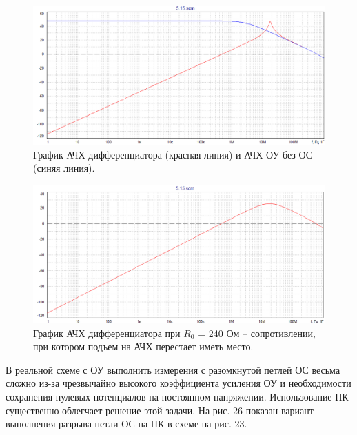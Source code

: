 \documentclass[a4paper,14pt]{extarticle}
\begin{document}
    \begin{figure}[h!]
        \captionsetup{justification=centering}
        \begin{center}
            \includegraphics[scale=0.6]{22.png}
        \end{center}
        \vspace{-0.7cm}
        \caption{График АЧХ дифференциатора (красная линия) и АЧХ ОУ без ОС (синяя линия).} 
    \end{figure}
    \begin{figure}[h!]
        \captionsetup{justification=centering}
        \begin{center}
            \includegraphics[scale=0.6]{23.png}
        \end{center}
        \vspace{-0.7cm}
        \caption{График АЧХ дифференциатора при $R_0$ = 240 Ом – сопротивлении, при котором подъем на АЧХ перестает иметь место.} 
    \end{figure}
 
    В реальной схеме с ОУ выполнить измерения с разомкнутой петлей ОС 
    весьма сложно из-за чрезвычайно высокого коэффициента усиления ОУ и 
    необходимости сохранения нулевых потенциалов на постоянном напряжении. 
    Использование ПК существенно облегчает решение этой задачи. На рис. 26 
    показан вариант выполнения разрыва петли ОС на ПК в схеме на рис. 23.
\end{document}

